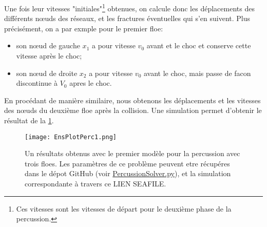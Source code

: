 Une fois leur vitesses "initiales"\footnote{Ces vitesses sont les vitesses de départ pour le deuxième phase de la percussion.} obtenues, on calcule donc les déplacements des différents n\oe{}uds des réseaux, et les fractures éventuelles qui s'en suivent. Plus précisément, on a par exmple pour le premier floe:
\begin{itemize}
    \item son n\oe{}ud de gauche $x_1$ a pour vitesse $v_0$ avant et le choc et conserve cette vitesse après le choc;
    \item son n\oe{}ud de droite $x_2$ a pour vitesse $v_0$ avant le choc, mais passe de facon discontinue à $V_0$ apres le choc.
\end{itemize}
En procédant de manière similaire, nous obtenons les déplacements et les vitesses des n\oe{}uds du deuxième floe après la collision. Une simulation permet d'obtenir le résultat de la \cref{fig:frac1d3}.
\begin{figure}[!h]
    \centering
    \texttt{[image: EnsPlotPerc1.png]}
    \caption{Un résultats obtenus avec le premier modèle pour la percussion avec trois floes. Les paramètres de ce problème peuvent etre récupéres dans le dépot GitHub (voir \href{https://github.com/desmond-rn/ice-floes/blob/master/code/simu1D/PercussionSolver.py}{PercussionSolver.py}), et la simulation correspondante à travers ce LIEN SEAFILE.}
    \label{fig:frac1d3}
\end{figure}





